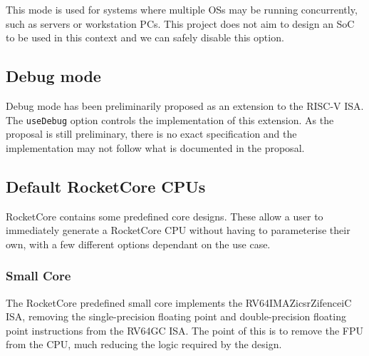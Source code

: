 This mode is used for systems where multiple OSs may be running concurrently, such as servers or workstation PCs. This project does not aim to design an SoC to be used in this context and we can safely disable this option.

\subsection{Debug mode}
Debug mode has been preliminarily proposed as an extension to the RISC-V ISA. The \texttt{useDebug} option controls the implementation of this extension. As the proposal is still preliminary, there is no exact specification and the implementation may not follow what is documented in the proposal.

\subsection{Default RocketCore CPUs}
RocketCore contains some predefined core designs. These allow a user to immediately generate a RocketCore CPU without having to parameterise their own, with a few different options dependant on the use case.

\subsubsection{Small Core}
The RocketCore predefined small core implements the RV64IMAZicsrZifenceiC ISA, removing the single-precision floating point and double-precision floating point instructions from the RV64GC ISA. The point of this is to remove the FPU from the CPU, much reducing the logic required by the design.

